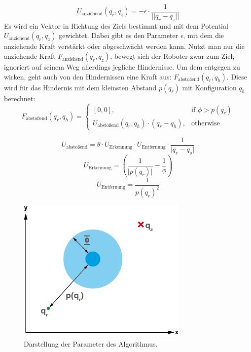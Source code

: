 \begin{equation}\label{eq:pot_attr}
	U_{\text{anziehend}}(q_r, q_z) = - \epsilon \cdot \frac{1}{\lvert\lvert q_r - q_z \rvert\rvert}
\end{equation}
Es wird ein Vektor in Richtung des Ziels bestimmt und mit dem Potential $U_{\text{anziehend}}(q_r, q_z)$ gewichtet. Dabei gibt es den Parameter $\epsilon$, mit dem die anziehende Kraft verstärkt oder abgeschwächt werden kann.
\newline
Nutzt man nur die anziehende Kraft $F_{\text{anziehend}}(q_r, q_z)$, bewegt sich der Roboter zwar zum Ziel, ignoriert auf seinem Weg allerdings jegliche Hindernisse.
Um dem entgegen zu wirken, geht auch von den Hindernissen eine Kraft aus: $F_{\text {abstoßend}}(q_r, q_h)$.
Diese wird für das Hindernis mit dem kleinsten Abstand $p(q_r)$ mit Konfiguration $q_h$  berechnet:
\begin{equation}\label{eq:grad_rep}
	F_{\text{abstoßend}}(q_r, q_h) =
	\begin{cases}
    [0,0] ,& \text{if } \phi > p(q_r)\\
    U_{\text{abstoßend}}(q_r, q_h) \cdot (q_r-q_h),               & \text{otherwise}
\end{cases}
\end{equation}

\begin{equation}\label{eq:pot_rep}
     U_{\text{abstoßend}} = \theta \cdot U_{\text{Erkennung}} \cdot U_{\text{Entfernung}} \cdot \frac{1}{ \lvert q_r - q_o \rvert }
\end{equation}
\begin{equation}
 U_{\text{Erkennung}} = \left( \frac{1}{\lvert p(q_r) \rvert} - \frac{1}{\phi} \right)
\end{equation}
\begin{equation}
U_{\text{Entfernung}} = \frac{1}{p(q_r)^2}
\end{equation}

\begin{figure}
  \centering
  \includegraphics[width=0.7\linewidth, height=0.7\linewidth]{img/Params}
  \caption{Darstellung der Parameter des Algorithmus.}
  \label{fig:params}
\end{figure}

